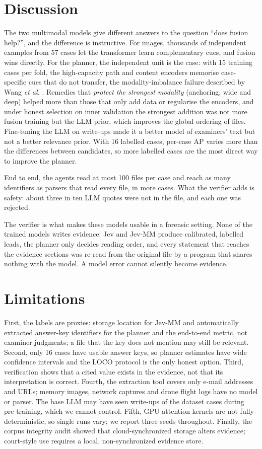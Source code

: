 \documentclass[conference]{IEEEtran}
\begin{document}
\section{Discussion}
The two multimodal models give different answers to the question ``does fusion help?'', and the difference is
instructive. For images, thousands of independent examples from 57 cases let the transformer learn complementary
cues, and fusion wins directly. For the planner, the independent unit is the case: with 15 training cases per fold,
the high-capacity path and content encoders memorise case-specific cues that do not transfer, the modality-imbalance
failure described by Wang \emph{et al.} \cite{wang2020}. Remedies that \emph{protect the strongest modality}
(anchoring, wide and deep) helped more than those that only add data or regularise the encoders, and under honest
selection on inner validation the strongest addition was not more fusion training but the LLM prior, which improves
the global ordering of files. Fine-tuning the LLM on write-ups made it a better model of examiners' text but not a
better relevance prior. With 16 labelled cases, per-case AP varies more than the differences between candidates, so
more labelled cases are the most direct way to improve the planner.

End to end, the agents read at most 100 files per case and reach as many identifiers as parsers that read every
file, in more cases. What the verifier adds is safety: about three in ten LLM quotes were not in the file, and each one
was rejected.

The verifier is what makes these models usable in a forensic setting. None of the trained models writes evidence:
Jev and Jev-MM produce calibrated, labelled leads, the planner only decides reading order, and every statement that
reaches the evidence sections was re-read from the original file by a program that shares nothing with the model. A
model error cannot silently become evidence.

\section{Limitations}
First, the labels are proxies: storage location for Jev-MM and automatically extracted answer-key identifiers for
the planner and the end-to-end metric, not examiner judgments; a file that the key does not mention may still be
relevant. Second, only 16 cases have usable answer keys, so planner estimates have wide confidence intervals and the
LOCO protocol is the only honest option. Third, verification shows that a cited value exists in the evidence, not
that its interpretation is correct. Fourth, the extraction tool covers only e-mail addresses and URLs; memory images,
network captures and drone flight logs have no model or parser. The base LLM may have seen write-ups of the dataset
cases during pre-training, which we cannot control. Fifth, GPU attention kernels are not fully deterministic, so
single runs vary; we report three seeds throughout. Finally, the corpus integrity audit showed that
cloud-synchronized storage alters evidence; court-style use requires a local, non-synchronized evidence store.
\end{document}
